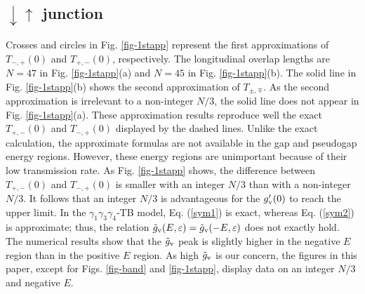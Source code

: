 \documentclass{jpsj3}
\begin{document}
\subsection{$\downarrow\uparrow$ junction}
Crosses and circles in Fig. \ref{fig-1stapp}
represent the first approximations of $T_{-,+}(0)$ and $T_{+,-}(0)$, respectively.
The longitudinal overlap lengths are $N=47$ 
in Fig. \ref{fig-1stapp}(a) and $N=45$ in Fig. \ref{fig-1stapp}(b).
The solid line in Fig. \ref{fig-1stapp}(b)
shows the second approximation
of $T_{\pm,\mp}$.
As the second approximation is irrelevant to a non-integer $N/3$,
the solid line does not appear in Fig. \ref{fig-1stapp}(a).
These approximation results reproduce well
the exact $T_{+,-}(0)$ and $T_{-,+}(0)$ displayed by
the dashed lines.
Unlike the exact calculation, the approximate formulas
are not available in the gap and pseudogap energy regions.
However, these energy regions
are unimportant because of their low transmission rate.
As Fig. \ref{fig-1stapp} shows, the difference between $T_{+,-}(0)$ and $T_{-,+}(0)$ is smaller
with an integer $N/3$ than with a non-integer $N/3$.
It follows that an integer $N/3$
is advantageous for the $g'_{\rm v}(0)$ to reach the upper limit.
In the $\gamma_1\gamma_3\gamma_4$-TB model,
Eq. (\ref{sym1}) is exact, whereas  Eq. (\ref{sym2}) is approximate; thus,
 the relation $\tilde{g}_{\rm v}(E,\varepsilon) =
\tilde{g}_{\rm v}(-E,\varepsilon) $ does not exactly hold.
The numerical results show that the $\tilde{g}_{\rm v}$
peak is slightly higher in the negative $E$
region than in the positive $E$ region.
As high $\tilde{g}_{\rm v}$ is our concern, 
 the figures in this paper, except for Figs. \ref{fig-band} and \ref{fig-1stapp}, display data on an integer $N/3$ and negative $E$.
\end{document}
